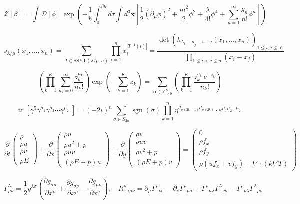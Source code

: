 \documentclass[a4paper,9pt]{article}
\begin{document}
\[
\mathcal{Z}[\beta] = \int\mathcal{D}[\phi]\,\exp\!\left(-\frac{1}{\hbar}\int_0^{\beta\hbar}\!\!\!d\tau\int d^3\mathbf{x}\left[\frac{1}{2}(\partial_\mu\phi)^2+\frac{m^2}{2}\phi^2+\frac{\lambda}{4!}\phi^4+\sum_{n=1}^{\infty}\frac{g_n}{n!}\phi^n\right]\right)
\]

\[
s_{\lambda/\mu}(x_1,\ldots,x_n) = \sum_{T\in\mathrm{SSYT}(\lambda/\mu,n)}\prod_{i=1}^{n}x_i^{|T^{-1}(i)|} = \frac{\det\!\left(h_{\lambda_i-\mu_j-i+j}(x_1,\ldots,x_n)\right)_{1\le i,j\le\ell}}{\prod_{1\le i<j\le n}(x_i-x_j)}
\]

\[
\left(\prod_{k=1}^{K}\sum_{n_k=0}^{\infty}\frac{z_k^{n_k}}{n_k!}\right)\exp\!\left(-\sum_{k=1}^{K}z_k\right) = \sum_{\mathbf{n}\in\mathbb{Z}_{\ge0}^K}\left(\prod_{k=1}^{K}\frac{z_k^{n_k}\,e^{-z_k}}{n_k!}\right)
\]

\[
\operatorname{tr}\!\left[\gamma^5\gamma^{\mu_1}\gamma^{\mu_2}\cdots\gamma^{\mu_{2n}}\right] = (-2i)^n\sum_{\sigma\in S_{2n}}\operatorname{sgn}(\sigma)\prod_{k=1}^{n}\eta^{\mu_{\sigma(2k-1)}\mu_{\sigma(2k)}} \cdot\varepsilon^{\mu_1\mu_2\cdots\mu_{2n}}
\]

\[
\frac{\partial}{\partial t}\begin{pmatrix}\rho\\\rho u\\\rho v\\\rho E\end{pmatrix}+\frac{\partial}{\partial x}\begin{pmatrix}\rho u\\\rho u^2+p\\\rho uv\\(\rho E+p)u\end{pmatrix}+\frac{\partial}{\partial y}\begin{pmatrix}\rho v\\\rho uv\\\rho v^2+p\\(\rho E+p)v\end{pmatrix} = \begin{pmatrix}0\\\rho f_x\\\rho f_y\\\rho(uf_x+vf_y)+\nabla\cdot(k\nabla T)\end{pmatrix}
\]

\[
\Gamma_{\mu\nu}^{\lambda} = \frac{1}{2}g^{\lambda\sigma}\!\left(\frac{\partial g_{\sigma\mu}}{\partial x^\nu}+\frac{\partial g_{\sigma\nu}}{\partial x^\mu}-\frac{\partial g_{\mu\nu}}{\partial x^\sigma}\right),\quad R^{\rho}{}_{\sigma\mu\nu} = \partial_\mu\Gamma^{\rho}{}_{\nu\sigma}-\partial_\nu\Gamma^{\rho}{}_{\mu\sigma}+\Gamma^{\rho}{}_{\mu\lambda}\Gamma^{\lambda}{}_{\nu\sigma}-\Gamma^{\rho}{}_{\nu\lambda}\Gamma^{\lambda}{}_{\mu\sigma}
\]
\end{document}
